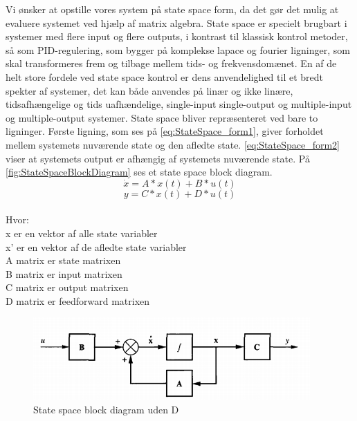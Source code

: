 Vi ønsker at opstille vores system på state space form, da det gør det mulig at evaluere systemet ved hjælp af matrix algebra. State space er specielt brugbart i systemer med flere input og flere outputs, i kontrast til klassisk kontrol metoder, så som PID-regulering, som bygger på komplekse lapace og fourier ligninger, som skal transformeres frem og tilbage mellem tids- og frekvensdomænet. 
En af de helt store fordele ved state space kontrol er dens anvendelighed til et bredt spekter af systemer, det kan både anvendes på linær og ikke linære, tidsafhængelige og tids uafhændelige, single-input single-output og multiple-input og multiple-output systemer.
State space bliver repræsenteret ved bare to ligninger. Første ligning, som ses på \autoref{eq:StateSpace_form1}, giver forholdet mellem systemets nuværende state og den afledte state. \autoref{eq:StateSpace_form2} viser at systemets output er afhængig af systemets nuværende state. På \autoref{fig:StateSpaceBlockDiagram} ses et state space block diagram. \begin{equation}
\dot{x} = A * x(t) + B * u(t)
\label{eq:StateSpace_form1}
\end{equation}
\begin{equation}
y = C * x(t) + D * u(t)
\label{eq:StateSpace_form2}
\end{equation}
\\
Hvor:\\
x er en vektor af alle state variabler\\
x' er en vektor af de afledte state variabler\\
A matrix er state matrixen  \\
B matrix er input matrixen \\
C matrix er output matrixen\\
D matrix er feedforward matrixen\\

\begin{figure}[H]
	\centering
	\includegraphics[width = 300pt]{Img/StateSpaceBlockDiagram.PNG}
	\caption{State space block diagram uden D}
	\label{fig:StateSpaceBlockDiagram}
\end{figure}



